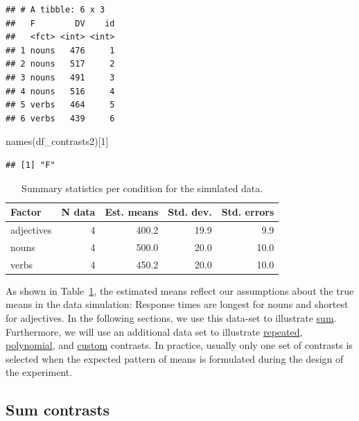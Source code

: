 \documentclass[
  12pt,
]{krantz}
\newenvironment{Shaded}{\begin{snugshade}}{\end{snugshade}}
\newcommand{\DecValTok}[1]{\textcolor[rgb]{0.00,0.00,0.81}{#1}}
\newcommand{\FunctionTok}[1]{\textcolor[rgb]{0.00,0.00,0.00}{#1}}
\newcommand{\NormalTok}[1]{#1}
\theoremstyle{definition}
\theoremstyle{definition}
\theoremstyle{definition}
\theoremstyle{definition}
\theoremstyle{remark}
\begin{document}
\begin{verbatim}
## # A tibble: 6 x 3
##   F        DV    id
##   <fct> <int> <int>
## 1 nouns   476     1
## 2 nouns   517     2
## 3 nouns   491     3
## 4 nouns   516     4
## 5 verbs   464     5
## 6 verbs   439     6
\end{verbatim}

\begin{Shaded}
\begin{Highlighting}[]
\FunctionTok{names}\NormalTok{(df\_contrasts2)[}\DecValTok{1}\NormalTok{]}
\end{Highlighting}
\end{Shaded}

\begin{verbatim}
## [1] "F"
\end{verbatim}

\begin{table}[b]

\caption{\label{tab:cTab2Means}Summary statistics per condition for the simulated data.}
\centering
\begin{tabular}[t]{l|r|r|r|r}
\hline
Factor & N data & Est. means & Std. dev. & Std. errors\\
\hline
adjectives & 4 & 400.2 & 19.9 & 9.9\\
\hline
nouns & 4 & 500.0 & 20.0 & 10.0\\
\hline
verbs & 4 & 450.2 & 20.0 & 10.0\\
\hline
\end{tabular}
\end{table}

As shown in Table~\ref{tab:cTab2Means}, the estimated means reflect our assumptions about the true means in the data simulation: Response times are longest for nouns and shortest for adjectives.
In the following sections, we use this data-set to illustrate \protect\hyperlink{sumcontrasts}{sum}. Furthermore, we will use an additional data set to illustrate \protect\hyperlink{repeatedcontrasts}{repeated}, \protect\hyperlink{polynomialContrasts}{polynomial}, and \protect\hyperlink{customContrasts}{custom} contrasts. In practice, usually only one set of contrasts is selected when the expected pattern of means is formulated during the design of the experiment.

\hypertarget{sumcontrasts}{%
\subsection{Sum contrasts}\label{sumcontrasts}}
\end{document}
